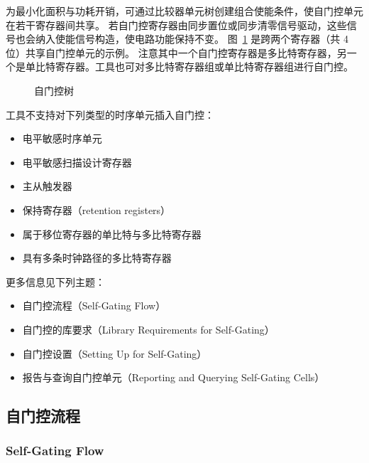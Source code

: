 为最小化面积与功耗开销，可通过比较器单元树创建组合使能条件，使自门控单元在若干寄存器间共享。
若自门控寄存器由同步置位或同步清零信号驱动，这些信号也会纳入使能信号构造，使电路功能保持不变。
图~\ref{fig:cg-self-tree} 是跨两个寄存器（共 4 位）共享自门控单元的示例。
注意其中一个自门控寄存器是多比特寄存器，另一个是单比特寄存器。工具也可对多比特寄存器组或单比特寄存器组进行自门控。

\begin{figure}[htbp]
\centering
{}
\caption{自门控树}
\label{fig:cg-self-tree}
\end{figure}

工具不支持对下列类型的时序单元插入自门控：
\begin{itemize}
  \item 电平敏感时序单元
  \item 电平敏感扫描设计寄存器
  \item 主从触发器
  \item 保持寄存器（retention registers）
  \item 属于移位寄存器的单比特与多比特寄存器
  \item 具有多条时钟路径的多比特寄存器
\end{itemize}

更多信息见下列主题：
\begin{itemize}
  \item 自门控流程（Self-Gating Flow）
  \item 自门控的库要求（Library Requirements for Self-Gating）
  \item 自门控设置（Setting Up for Self-Gating）
  \item 报告与查询自门控单元（Reporting and Querying Self-Gating Cells）
\end{itemize}

\subsection{自门控流程}
\subsubsection*{Self-Gating Flow}

